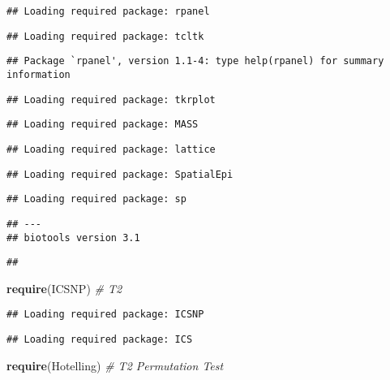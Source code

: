 \documentclass[]{article}
\newenvironment{Shaded}{\begin{snugshade}}{\end{snugshade}}
\newcommand{\KeywordTok}[1]{\textcolor[rgb]{0.13,0.29,0.53}{\textbf{#1}}}
\newcommand{\CommentTok}[1]{\textcolor[rgb]{0.56,0.35,0.01}{\textit{#1}}}
\newcommand{\NormalTok}[1]{#1}
\begin{document}
\begin{verbatim}
## Loading required package: rpanel
\end{verbatim}

\begin{verbatim}
## Loading required package: tcltk
\end{verbatim}

\begin{verbatim}
## Package `rpanel', version 1.1-4: type help(rpanel) for summary information
\end{verbatim}

\begin{verbatim}
## Loading required package: tkrplot
\end{verbatim}

\begin{verbatim}
## Loading required package: MASS
\end{verbatim}

\begin{verbatim}
## Loading required package: lattice
\end{verbatim}

\begin{verbatim}
## Loading required package: SpatialEpi
\end{verbatim}

\begin{verbatim}
## Loading required package: sp
\end{verbatim}

\begin{verbatim}
## ---
## biotools version 3.1
\end{verbatim}

\begin{verbatim}
## 
\end{verbatim}

\begin{Shaded}
\begin{Highlighting}[]
\KeywordTok{require}\NormalTok{(ICSNP) }\CommentTok{# T2}
\end{Highlighting}
\end{Shaded}

\begin{verbatim}
## Loading required package: ICSNP
\end{verbatim}

\begin{verbatim}
## Loading required package: ICS
\end{verbatim}

\begin{Shaded}
\begin{Highlighting}[]
\KeywordTok{require}\NormalTok{(Hotelling) }\CommentTok{# T2 Permutation Test}
\end{Highlighting}
\end{Shaded}
\end{document}
